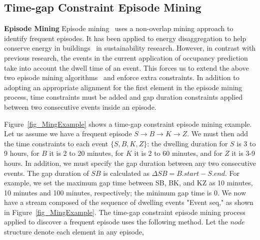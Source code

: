 
\subsection{Time-gap Constraint Episode Mining}
\textbf{Episode Mining}
Episode mining~\cite{mannila1997discovery} uses a non-overlap mining approach to identify frequent episodes. 
It has been applied to energy disaggregation to help conserve energy in buildings~\cite{shao2013temporal} in sustainability research. 
However, in contrast with previous research, 
the events in the current application of occupancy prediction take into account the
dwell time of an event. 
This forces us to extend the above two 
episode mining algorithms~\cite{laxman2008stream,patnaik2008inferring} 
and enforce extra constraints.
In addition to 
adopting an appropriate alignment for the first element in the episode mining process,  
time constraints must be added and gap duration constraints applied between 
two consecutive events inside an episode. 
%

Figure~\ref{fig_MingExample} shows a time-gap constraint episode mining example. 
Let us assume we have a frequent episode $S\rightarrow B \rightarrow K\rightarrow Z$. 
We must then add the time constraints to each event $\{S,B,K,Z\}$: 
the dwelling duration for $S$ is 3 to 9 hours,   
for $B$ it is 2 to 20 minutes, 
for $K$ it is 2 to 60 minutes, 
and for $Z$ it is 3-9 hours. 
In addition, we must specify the gap duration between any two consecutive events. 
The gap duration of $SB$ is calculated as $\Delta{SB} = B.start-S.end$. 
For example, we set the maximum gap time between SB, BK, and KZ as 
10 minutes, 10 minutes and 100 minutes, respectively; 
the minimum gap time is 0. 
We now have a stream composed of the sequence of dwelling events "Event seq," as shown 
in Figure~\ref{fig_MingExample}.  
 The time-gap constraint episode mining process applied
 to discover a frequent episode uses the following method. 
 Let the $node$ structure denote each element in any episode, 
